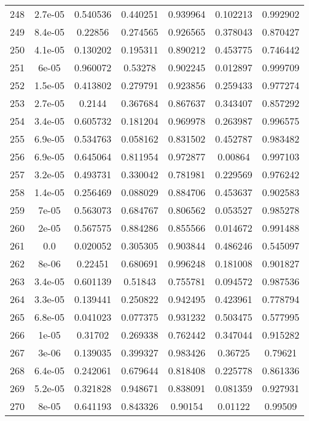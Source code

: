 \begin{table}
\begin{tabular}{c|c|c|c|c|c|c}
248 & 2.7e-05 & 0.540536 & 0.440251 & 0.939964 & 0.102213 & 0.992902\\
249 & 8.4e-05 & 0.22856 & 0.274565 & 0.926565 & 0.378043 & 0.870427\\
250 & 4.1e-05 & 0.130202 & 0.195311 & 0.890212 & 0.453775 & 0.746442\\
251 & 6e-05 & 0.960072 & 0.53278 & 0.902245 & 0.012897 & 0.999709\\
252 & 1.5e-05 & 0.413802 & 0.279791 & 0.923856 & 0.259433 & 0.977274\\
253 & 2.7e-05 & 0.2144 & 0.367684 & 0.867637 & 0.343407 & 0.857292\\
254 & 3.4e-05 & 0.605732 & 0.181204 & 0.969978 & 0.263987 & 0.996575\\
255 & 6.9e-05 & 0.534763 & 0.058162 & 0.831502 & 0.452787 & 0.983482\\
256 & 6.9e-05 & 0.645064 & 0.811954 & 0.972877 & 0.00864 & 0.997103\\
257 & 3.2e-05 & 0.493731 & 0.330042 & 0.781981 & 0.229569 & 0.976242\\
258 & 1.4e-05 & 0.256469 & 0.088029 & 0.884706 & 0.453637 & 0.902583\\
259 & 7e-05 & 0.563073 & 0.684767 & 0.806562 & 0.053527 & 0.985278\\
260 & 2e-05 & 0.567575 & 0.884286 & 0.855566 & 0.014672 & 0.991488\\
261 & 0.0 & 0.020052 & 0.305305 & 0.903844 & 0.486246 & 0.545097\\
262 & 8e-06 & 0.22451 & 0.680691 & 0.996248 & 0.181008 & 0.901827\\
263 & 3.4e-05 & 0.601139 & 0.51843 & 0.755781 & 0.094572 & 0.987536\\
264 & 3.3e-05 & 0.139441 & 0.250822 & 0.942495 & 0.423961 & 0.778794\\
265 & 6.8e-05 & 0.041023 & 0.077375 & 0.931232 & 0.503475 & 0.577995\\
266 & 1e-05 & 0.31702 & 0.269338 & 0.762442 & 0.347044 & 0.915282\\
267 & 3e-06 & 0.139035 & 0.399327 & 0.983426 & 0.36725 & 0.79621\\
268 & 6.4e-05 & 0.242061 & 0.679644 & 0.818408 & 0.225778 & 0.861336\\
269 & 5.2e-05 & 0.321828 & 0.948671 & 0.838091 & 0.081359 & 0.927931\\
270 & 8e-05 & 0.641193 & 0.843326 & 0.90154 & 0.01122 & 0.99509\\
\end{tabular}
\end{table}
